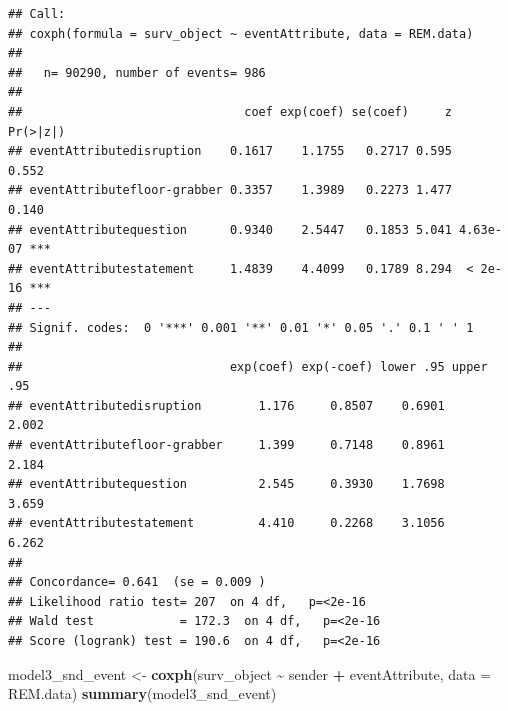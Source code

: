 \documentclass[
]{article}
\newenvironment{Shaded}{\begin{snugshade}}{\end{snugshade}}
\newcommand{\AttributeTok}[1]{\textcolor[rgb]{0.13,0.29,0.53}{#1}}
\newcommand{\FunctionTok}[1]{\textcolor[rgb]{0.13,0.29,0.53}{\textbf{#1}}}
\newcommand{\NormalTok}[1]{#1}
\newcommand{\OtherTok}[1]{\textcolor[rgb]{0.56,0.35,0.01}{#1}}
\newcommand{\SpecialCharTok}[1]{\textcolor[rgb]{0.81,0.36,0.00}{\textbf{#1}}}
\begin{document}
\begin{verbatim}
## Call:
## coxph(formula = surv_object ~ eventAttribute, data = REM.data)
## 
##   n= 90290, number of events= 986 
## 
##                               coef exp(coef) se(coef)     z Pr(>|z|)    
## eventAttributedisruption    0.1617    1.1755   0.2717 0.595    0.552    
## eventAttributefloor-grabber 0.3357    1.3989   0.2273 1.477    0.140    
## eventAttributequestion      0.9340    2.5447   0.1853 5.041 4.63e-07 ***
## eventAttributestatement     1.4839    4.4099   0.1789 8.294  < 2e-16 ***
## ---
## Signif. codes:  0 '***' 0.001 '**' 0.01 '*' 0.05 '.' 0.1 ' ' 1
## 
##                             exp(coef) exp(-coef) lower .95 upper .95
## eventAttributedisruption        1.176     0.8507    0.6901     2.002
## eventAttributefloor-grabber     1.399     0.7148    0.8961     2.184
## eventAttributequestion          2.545     0.3930    1.7698     3.659
## eventAttributestatement         4.410     0.2268    3.1056     6.262
## 
## Concordance= 0.641  (se = 0.009 )
## Likelihood ratio test= 207  on 4 df,   p=<2e-16
## Wald test            = 172.3  on 4 df,   p=<2e-16
## Score (logrank) test = 190.6  on 4 df,   p=<2e-16
\end{verbatim}

\begin{Shaded}
\begin{Highlighting}[]
\NormalTok{model3\_snd\_event }\OtherTok{\textless{}{-}} \FunctionTok{coxph}\NormalTok{(surv\_object }\SpecialCharTok{\textasciitilde{}}\NormalTok{ sender }\SpecialCharTok{+}\NormalTok{ eventAttribute, }\AttributeTok{data =}\NormalTok{ REM.data)}
\FunctionTok{summary}\NormalTok{(model3\_snd\_event)}
\end{Highlighting}
\end{Shaded}
\end{document}
